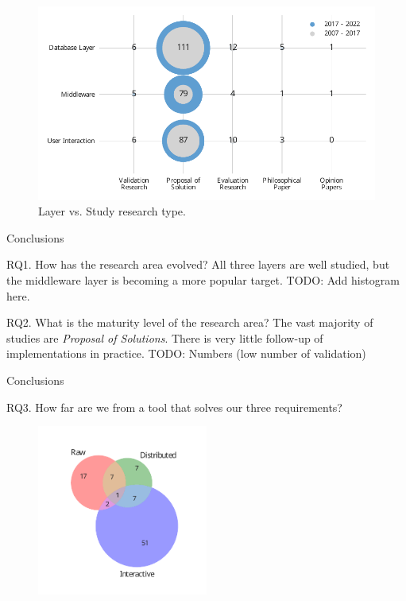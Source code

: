 \documentclass[10pt]{beamer}
\begin{document}
\begin{frame}{}
\begin{figure}
    \centering
    \includegraphics[width=\textwidth]{layer_vs_type.pdf}
    \caption{Layer vs. Study research type.}
\end{figure}
\end{frame}

\begin{frame}{Conclusions}
    \begin{block}{RQ1. How has the research area evolved?}
        \smallskip
        All three layers are well studied, but the middleware layer is becoming a more popular target.
        TODO: Add histogram here.
    \end{block}
    \begin{block}{RQ2. What is the maturity level of the research area?}
        \smallskip
        The vast majority of studies are \emph{Proposal of Solutions}. There is very little follow-up of implementations in practice.
        TODO: Numbers (low number of validation)
    \end{block}
\end{frame}

\begin{frame}{Conclusions}
    \begin{block}{RQ3. How far are we from a tool that solves our three requirements?}
        \begin{figure}
            \centering
            \includegraphics[width=0.5\textwidth]{venn.pdf}
        \end{figure}
        \cite{Han2017}
    \end{block}

\end{frame}
\end{document}
